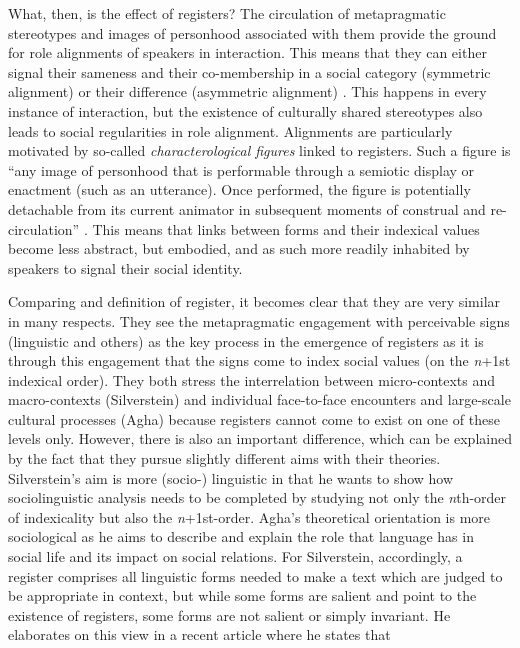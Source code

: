 What, then, is the effect of registers? The circulation of metapragmatic stereotypes and images of personhood associated with them provide the ground for role alignments of speakers in interaction. This means that they can either signal their sameness and their co-membership in a social category (symmetric alignment) or their difference (asymmetric alignment) \citep[133]{Agha2007}. This happens in every instance of interaction, but the existence of culturally shared stereotypes also leads to social regularities in role alignment. Alignments are particularly motivated by so-called \textit{characterological figures} linked to registers. Such a figure is “any image of personhood that is performable through a semiotic display or enactment (such as an utterance). Once performed, the figure is potentially detachable from its current animator in subsequent moments of construal and re-circulation” \citep[177]{Agha2007}. This means that links between forms and their indexical values become less abstract, but embodied, and as such more readily inhabited by speakers to signal their social identity.

Comparing  and  definition of register, it becomes clear that they are very similar in many respects. They see the metapragmatic engagement with perceivable signs (linguistic and others) as the key process in the emergence of registers as it is through this engagement that the signs come to index social values (on the \emph{n}+1st indexical order). They both stress the interrelation between micro-contexts and macro-contexts (Silverstein) and individual face-to-face encounters and large-scale cultural processes (Agha) because registers cannot come to exist on one of these levels only. However, there is also an important difference, which can be explained by the fact that they pursue slightly different aims with their theories. Silverstein’s aim is more (socio-) linguistic in that he wants to show how sociolinguistic analysis needs to be completed by studying not only the \emph{n}th-order of indexicality but also the \emph{n}+1st-order. Agha’s theoretical orientation is more sociological as he aims to describe and explain the role that language has in social life and its impact on social relations. For Silverstein, accordingly, a register comprises all linguistic forms needed to make a text which are judged to be appropriate in context, but while some forms are salient and point to the existence of registers, some forms are not salient or simply invariant. He elaborates on this view in a recent article where he states that

